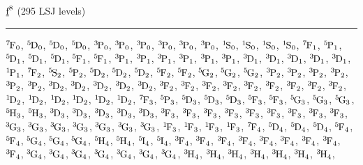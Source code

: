 \begin{mdframed}
\begin{center}
$\forb^{8}$
(295 LSJ levels)
\vspace{0.25cm}
\hrule
\vspace{0.25cm}

$\LSJterm{7}{F}{0}$, $\LSJterm{5}{D}{0}$, $\LSJterm{5}{D}{0}$, $\LSJterm{5}{D}{0}$, $\LSJterm{3}{P}{0}$, $\LSJterm{3}{P}{0}$, $\LSJterm{3}{P}{0}$, $\LSJterm{3}{P}{0}$, $\LSJterm{3}{P}{0}$, $\LSJterm{3}{P}{0}$, $\LSJterm{1}{S}{0}$, $\LSJterm{1}{S}{0}$, $\LSJterm{1}{S}{0}$, $\LSJterm{1}{S}{0}$, $\LSJterm{7}{F}{1}$, $\LSJterm{5}{P}{1}$, $\LSJterm{5}{D}{1}$, $\LSJterm{5}{D}{1}$, $\LSJterm{5}{D}{1}$, $\LSJterm{5}{F}{1}$, $\LSJterm{5}{F}{1}$, $\LSJterm{3}{P}{1}$, $\LSJterm{3}{P}{1}$, $\LSJterm{3}{P}{1}$, $\LSJterm{3}{P}{1}$, $\LSJterm{3}{P}{1}$, $\LSJterm{3}{P}{1}$, $\LSJterm{3}{D}{1}$, $\LSJterm{3}{D}{1}$, $\LSJterm{3}{D}{1}$, $\LSJterm{3}{D}{1}$, $\LSJterm{3}{D}{1}$, $\LSJterm{1}{P}{1}$, $\LSJterm{7}{F}{2}$, $\LSJterm{5}{S}{2}$, $\LSJterm{5}{P}{2}$, $\LSJterm{5}{D}{2}$, $\LSJterm{5}{D}{2}$, $\LSJterm{5}{D}{2}$, $\LSJterm{5}{F}{2}$, $\LSJterm{5}{F}{2}$, $\LSJterm{5}{G}{2}$, $\LSJterm{5}{G}{2}$, $\LSJterm{5}{G}{2}$, $\LSJterm{3}{P}{2}$, $\LSJterm{3}{P}{2}$, $\LSJterm{3}{P}{2}$, $\LSJterm{3}{P}{2}$, $\LSJterm{3}{P}{2}$, $\LSJterm{3}{P}{2}$, $\LSJterm{3}{D}{2}$, $\LSJterm{3}{D}{2}$, $\LSJterm{3}{D}{2}$, $\LSJterm{3}{D}{2}$, $\LSJterm{3}{D}{2}$, $\LSJterm{3}{F}{2}$, $\LSJterm{3}{F}{2}$, $\LSJterm{3}{F}{2}$, $\LSJterm{3}{F}{2}$, $\LSJterm{3}{F}{2}$, $\LSJterm{3}{F}{2}$, $\LSJterm{3}{F}{2}$, $\LSJterm{3}{F}{2}$, $\LSJterm{3}{F}{2}$, $\LSJterm{1}{D}{2}$, $\LSJterm{1}{D}{2}$, $\LSJterm{1}{D}{2}$, $\LSJterm{1}{D}{2}$, $\LSJterm{1}{D}{2}$, $\LSJterm{1}{D}{2}$, $\LSJterm{7}{F}{3}$, $\LSJterm{5}{P}{3}$, $\LSJterm{5}{D}{3}$, $\LSJterm{5}{D}{3}$, $\LSJterm{5}{D}{3}$, $\LSJterm{5}{F}{3}$, $\LSJterm{5}{F}{3}$, $\LSJterm{5}{G}{3}$, $\LSJterm{5}{G}{3}$, $\LSJterm{5}{G}{3}$, $\LSJterm{5}{H}{3}$, $\LSJterm{5}{H}{3}$, $\LSJterm{3}{D}{3}$, $\LSJterm{3}{D}{3}$, $\LSJterm{3}{D}{3}$, $\LSJterm{3}{D}{3}$, $\LSJterm{3}{D}{3}$, $\LSJterm{3}{F}{3}$, $\LSJterm{3}{F}{3}$, $\LSJterm{3}{F}{3}$, $\LSJterm{3}{F}{3}$, $\LSJterm{3}{F}{3}$, $\LSJterm{3}{F}{3}$, $\LSJterm{3}{F}{3}$, $\LSJterm{3}{F}{3}$, $\LSJterm{3}{F}{3}$, $\LSJterm{3}{G}{3}$, $\LSJterm{3}{G}{3}$, $\LSJterm{3}{G}{3}$, $\LSJterm{3}{G}{3}$, $\LSJterm{3}{G}{3}$, $\LSJterm{3}{G}{3}$, $\LSJterm{3}{G}{3}$, $\LSJterm{1}{F}{3}$, $\LSJterm{1}{F}{3}$, $\LSJterm{1}{F}{3}$, $\LSJterm{1}{F}{3}$, $\LSJterm{7}{F}{4}$, $\LSJterm{5}{D}{4}$, $\LSJterm{5}{D}{4}$, $\LSJterm{5}{D}{4}$, $\LSJterm{5}{F}{4}$, $\LSJterm{5}{F}{4}$, $\LSJterm{5}{G}{4}$, $\LSJterm{5}{G}{4}$, $\LSJterm{5}{G}{4}$, $\LSJterm{5}{H}{4}$, $\LSJterm{5}{H}{4}$, $\LSJterm{5}{I}{4}$, $\LSJterm{5}{I}{4}$, $\LSJterm{3}{F}{4}$, $\LSJterm{3}{F}{4}$, $\LSJterm{3}{F}{4}$, $\LSJterm{3}{F}{4}$, $\LSJterm{3}{F}{4}$, $\LSJterm{3}{F}{4}$, $\LSJterm{3}{F}{4}$, $\LSJterm{3}{F}{4}$, $\LSJterm{3}{F}{4}$, $\LSJterm{3}{G}{4}$, $\LSJterm{3}{G}{4}$, $\LSJterm{3}{G}{4}$, $\LSJterm{3}{G}{4}$, $\LSJterm{3}{G}{4}$, $\LSJterm{3}{G}{4}$, $\LSJterm{3}{G}{4}$, $\LSJterm{3}{H}{4}$, $\LSJterm{3}{H}{4}$, $\LSJterm{3}{H}{4}$, $\LSJterm{3}{H}{4}$, $\LSJterm{3}{H}{4}$, $\LSJterm{3}{H}{4}$, $\LSJterm{3}{H}{4}$, 
\end{center}
\end{mdframed}
